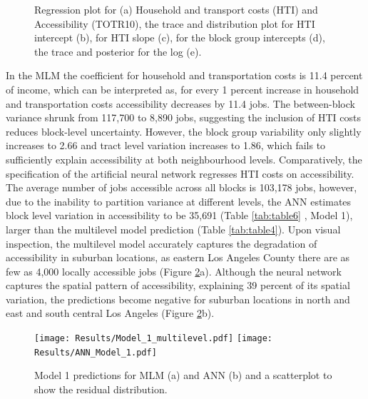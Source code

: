 \documentclass[a4paper,UKenglish]{lipics-v2018}
\begin{document}
\begin{figure}[H]
    \centering
    \caption[Model 1 Trace and Posterior plots]{Regression plot for (a) Household and transport costs (HTI) and Accessibility (TOTR10), the trace and distribution plot for HTI intercept (b), for HTI slope (c), for the block group intercepts (d), the trace and posterior for the log (e).} 
    \label{fig:Fit_1_robust}
\end{figure}
In the MLM the coefficient for household and transportation costs is 11.4 percent of income, which can be interpreted as, for every 1 percent increase in household and transportation costs accessibility decreases by 11.4 jobs. The between-block variance shrunk from 117,700 to 8,890 jobs, suggesting the inclusion of HTI costs reduces block-level uncertainty. However, the block group variability only slightly increases to 2.66 and tract level variation increases to 1.86, which fails to sufficiently explain accessibility at both neighbourhood levels.  Comparatively, the specification of the artificial neural network regresses HTI costs on accessibility. The average number of jobs accessible across all blocks is 103,178 jobs, however, due to the inability to partition variance at different levels, the ANN estimates block level variation in accessibility to be 35,691 (Table \ref{tab:table6} , Model 1), larger than the multilevel model prediction (Table \ref{tab:table4}). Upon visual inspection, the multilevel model accurately captures the degradation of accessibility in suburban locations, as eastern Los Angeles County there are as few as 4,000 locally accessible jobs (Figure \ref{fig:Model_1_multilevel}a). Although the neural network captures the spatial pattern of accessibility, explaining 39 percent of its spatial variation, the predictions become negative for suburban locations in north and east and south central Los Angeles (Figure \ref{fig:Model_1_multilevel}b). 

\begin{figure}[H]
    \texttt{[image: Results/Model\_1\_multilevel.pdf]}
    \texttt{[image: Results/ANN\_Model\_1.pdf]}
    \caption[Model 1 predictions]{Model 1 predictions for MLM (a) and ANN (b) and a scatterplot to show the residual distribution. } 
    \label{fig:Model_1_multilevel}
\end{figure}
\end{document}
